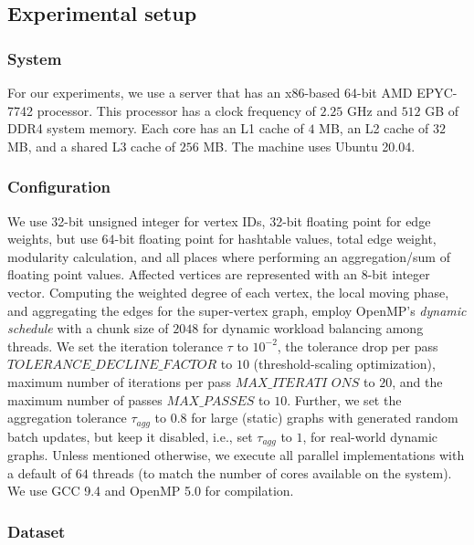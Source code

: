 \subsection{Experimental setup}
\label{sec:setup}

\subsubsection{System}
\label{sec:system}

For our experiments, we use a server that has an x86-based 64-bit AMD EPYC-7742 processor. This processor has a clock frequency of $2.25$ GHz and $512$ GB of DDR4 system memory. Each core has an L1 cache of $4$ MB, an L2 cache of $32$ MB, and a shared L3 cache of $256$ MB. The machine uses Ubuntu 20.04.


\subsubsection{Configuration}
\label{sec:configuration}

We use 32-bit unsigned integer for vertex IDs, 32-bit floating point for edge weights, but use 64-bit floating point for hashtable values, total edge weight, modularity calculation, and all places where performing an aggregation/sum of floating point values. Affected vertices are represented with an 8-bit integer vector. Computing the weighted degree of each vertex, the local moving phase, and aggregating the edges for the super-vertex graph, employ OpenMP's \textit{dynamic schedule} with a chunk size of $2048$ for dynamic workload balancing among threads. We set the iteration tolerance $\tau$ to $10^{-2}$, the tolerance drop per pass $TOLERANCE\_DECLINE\_FACTOR$ to $10$ (threshold-scaling optimization), maximum number of iterations per pass $MAX\_ITERATI$ $ONS$ to $20$, and the maximum number of passes $MAX\_PASSES$ to $10$. Further, we set the aggregation tolerance $\tau_{agg}$ to $0.8$ for large (static) graphs with generated random batch updates, but keep it disabled, i.e., set $\tau_{agg}$ to $1$, for real-world dynamic graphs. Unless mentioned otherwise, we execute all parallel implementations with a default of $64$ threads (to match the number of cores available on the system). We use GCC 9.4 and OpenMP 5.0 \cite{openmp18} for compilation.


\subsubsection{Dataset}
\label{sec:dataset}

